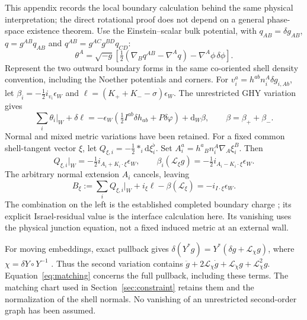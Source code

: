 \documentclass[11pt]{article}
\theoremstyle{remark}
\newcommand{\Lie}{\mathcal L}
\newcommand{\dd}{\mathrm d}
\begin{document}
This appendix records the local boundary calculation behind the same
physical interpretation; the direct rotational proof does not depend on a
general phase-space existence theorem. Use the Einstein--scalar bulk
potential, with $q_{AB}=\delta g_{AB}$, $q=g^{AB}q_{AB}$ and
$q^{AB}=g^{AC}g^{BD}q_{CD}$:
\begin{equation}
 \theta^A=\sqrt{-g}\left[\tfrac12(\nabla_Bq^{AB}-\nabla^Aq)
                         -\nabla^A\phi\,\delta\phi\right].
\end{equation}
Represent the two outward boundary forms in the same co-oriented shell
density convention, including the Noether potentials and corners.
For $v_i^a=h^{ab}n_i^A\delta g_{i,Ab}$, let
$\beta_i=-\tfrac12i_{v_i}\epsilon_W$ and
$\ell=(K_++K_--\sigma)\epsilon_W$.
The unrestricted GHY variation gives
\begin{equation}
 \sum_i\theta_i|_W+\delta\ell
 =-\epsilon_W\left(\tfrac12I^{ab}\delta h_{ab}
                         +P\delta\varphi\right)+\dd_W\beta,
 \qquad \beta=\beta_++\beta_-.
 \label{eq:boundary-variation}
\end{equation}
Normal and mixed metric variations have been retained.
For a fixed common shell-tangent vector $\xi$, let
$Q_{\xi,i}=-\tfrac12*_i\dd\xi_i^\flat$. Set
$A_i^a=h^a{}_Bn_i^A\nabla_A\xi_i^B$. Then
\begin{equation}
 Q_{\xi,i}|_W=-\tfrac12i_{A_i+K_i\cdot\xi}\epsilon_W,
 \qquad
 \beta_i(\Lie_\xi g)=-\tfrac12i_{A_i-K_i\cdot\xi}\epsilon_W.
\end{equation}
The arbitrary normal extension $A_i$ cancels, leaving
\begin{equation}
 B_\xi:=\sum_iQ_{\xi,i}|_W+i_\xi\ell-\beta(\Lie_\xi)
       =-i_{I\cdot\xi}\epsilon_W.
 \label{eq:boundary-charge}
\end{equation}
The combination on the left is the established completed boundary charge
\cite[Eq.~(2.51)]{HarlowWu2020}; its explicit Israel-residual value is the
interface calculation here. Its vanishing uses the physical junction
equation, not a fixed induced metric at an external wall.

For moving embeddings, exact pullback gives
$\delta(Y^*g)=Y^*(\delta g+\Lie_\chi g)$, where
$\chi=\delta Y\circ Y^{-1}$ \cite{Speranza2018}. Thus the second variation
contains $\ddot g+2\Lie_\chi\dot g+\Lie_{\dot\chi}g+\Lie_\chi^2g$.
Equation~\eqref{eq:matching} concerns the full pullback, including these
terms. The matching chart used in Section~\ref{sec:constraint} retains them
and the normalization of the shell normals. No vanishing of an unrestricted
second-order graph has been assumed.



\end{document}
